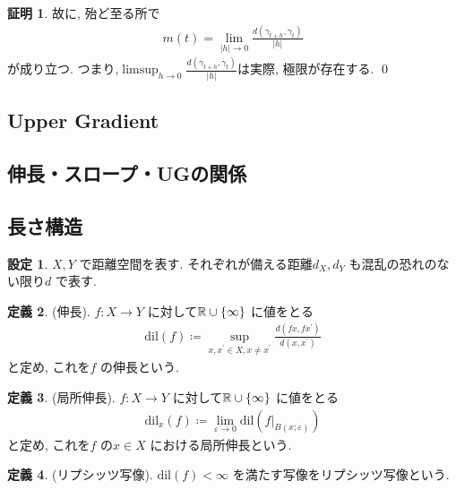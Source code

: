 \documentclass[10pt, fleqn, label-section=none]{bxjsarticle}
\theoremstyle{definition}
\newtheorem{dfn}{定義}[section]
\newtheorem{setting}[dfn]{設定}
\newtheorem*{pf*}{証明}
\newcommand{\veps}{\varepsilon}
\newcommand{\cbra}[1]{\mleft\{#1\mright\}}
\newcommand{\abs}[1]{\left|#1\right|}
\renewcommand{\;}{\, ; \,}
\begin{document}
\begin{pf*}
故に, 殆ど至る所で
\begin{align*} m(t) = \lim_{\abs h \rightarrow 0} \frac{d(\gamma_{t+h} , \gamma_t)}{\abs h} \end{align*}
が成り立つ. つまり,$\limsup_{h \rightarrow 0} \frac{d(\gamma_{t +h} , \gamma_t)}{\abs h}$は実際, 極限が存在する. 
\qed
\end{pf*}

\subsection{Upper Gradient}




\subsection{伸長・スロープ・UGの関係}


\subsection{長さ構造}

\begin{setting}
$X, Y$ で距離空間を表す. それぞれが備える距離$d_X, d_Y$ も混乱の恐れのない限り$d$ で表す. 

\end{setting}

\begin{dfn}(伸長). $f: X \rightarrow Y$ に対して$\mathbb R \cup \cbra{\infty}$ に値をとる
\begin{align*} \textrm{dil} (f) \coloneqq \sup_{x, x^\prime \in X, x \neq x^\prime } \frac{d(fx, fx^\prime )}{ d(x, x^\prime) } \end{align*} 
と定め, これを$f$ の伸長という. 

\end{dfn}

\begin{dfn}(局所伸長). $f: X \rightarrow Y$ に対して$\mathbb R \cup \cbra{\infty}$ に値をとる
\begin{align*} \textrm{dil}_x (f) \coloneqq \lim_{\veps \rightarrow 0} \textrm{dil}(f | _ {B(x; \veps)}) \end{align*} 
と定め, これを$f$ の$x \in X$ における局所伸長という. 

\end{dfn}

\begin{dfn}(リプシッツ写像). $\textrm{dil} (f) < \infty$ を満たす写像をリプシッツ写像という. 

\end{dfn}
\end{document}

